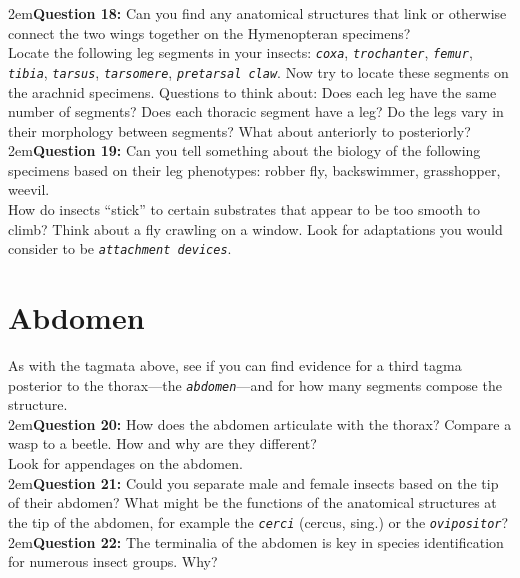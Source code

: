 \documentclass[letterpaper, 11pt]{article}
\newcommand{\latinword}[1]{\texttt{\itshape #1}}%
\begin{document}
\hangindent2em\textbf{Question 18:} Can you find any anatomical structures that link or otherwise connect the two wings together on the Hymenopteran specimens?\\

\noindent{}Locate the following leg segments in your insects: \latinword{coxa}, \latinword{trochanter}, \latinword{femur}, \latinword{tibia}, \latinword{tarsus}, \latinword{tarsomere}, \latinword{pretarsal claw}. Now try to locate these segments on the arachnid specimens. Questions to think about: Does each leg have the same number of segments? Does each thoracic segment have a leg? Do the legs vary in their morphology between segments? What about anteriorly to posteriorly?\\


\hangindent2em\textbf{Question 19:} Can you tell something about the biology of the following specimens based on their leg phenotypes: robber fly, backswimmer, grasshopper, weevil.\\

\noindent{}How do insects ``stick'' to certain substrates that appear to be too smooth to climb? Think about a fly crawling on a window. Look for adaptations you would consider to be \latinword{attachment devices}.\\

\section{Abdomen}
As with the tagmata above, see if you can find evidence for a third tagma posterior to the thorax---the \latinword{abdomen}---and for how many segments compose the structure.\\

\hangindent2em\textbf{Question 20:} How does the abdomen articulate with the thorax? Compare a wasp to a beetle. How and why are they different?\\

\noindent{}Look for appendages on the abdomen. \\

\hangindent2em\textbf{Question 21:} Could you separate male and female insects based on the tip of their abdomen? What might be the functions of the anatomical structures at the tip of the abdomen, for example the \latinword{cerci} (cercus, sing.) or the \latinword{ovipositor}? \\

\hangindent2em\textbf{Question 22:} The terminalia of the abdomen is key in species identification for numerous insect groups. Why? \\
\end{document}
